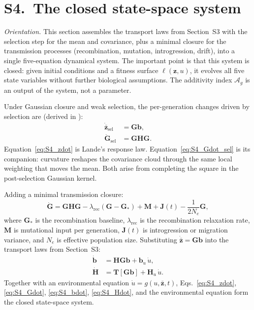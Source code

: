 \documentclass[11pt]{article}
\newcommand{\vect}[1]{\boldsymbol{#1}}
\newcommand{\mat}[1]{\mathbf{#1}}
\newcommand{\Ag}{\mathcal{A}_{g}}
\begin{document}
\section*{S4.~The closed state-space system}
\label{sec:statespace}

\noindent\textit{Orientation.}
This section assembles the transport laws from Section~S3
with the selection step for the mean and covariance, plus a
minimal closure for the transmission processes (recombination,
mutation, introgression, drift), into a single five-equation
dynamical system.
The important point is that this system is closed: given initial
conditions and a fitness surface $\ell(\vect{z},u)$, it evolves
all five state variables without further biological assumptions.
The additivity index $\Ag$ is an output of the system, not a
parameter.

Under Gaussian closure and weak selection, the per-generation
changes driven by selection are (derived in \cite{OrtizBarrientosCooper2026}):
\begin{align}
\dot{\bar{\vect{z}}}_{\mathrm{sel}} &= \mat{G}\vect{b},
\label{eq:S4_zdot} \\[4pt]
\dot{\mat{G}}_{\mathrm{sel}} &= \mat{G}\mat{H}\mat{G}.
\label{eq:S4_Gdot_sel}
\end{align}
Equation~\eqref{eq:S4_zdot} is Lande's response law.
Equation~\eqref{eq:S4_Gdot_sel} is its companion: curvature
reshapes the covariance cloud through the same local weighting
that moves the mean.
Both arise from completing the square in the post-selection
Gaussian kernel.

Adding a minimal transmission closure:
\begin{equation}
\dot{\mat{G}}
= \mat{G}\mat{H}\mat{G}
  - \lambda_{\mathrm{rec}}(\mat{G} - \mat{G}_*)
  + \mat{M}
  + \mat{J}(t)
  - \frac{1}{2N_e}\mat{G},
\label{eq:S4_Gdot}
\end{equation}
where $\mat{G}_*$ is the recombination baseline, $\lambda_{\mathrm{rec}}$
is the recombination relaxation rate, $\mat{M}$ is mutational
input per generation, $\mat{J}(t)$ is introgression or migration
variance, and $N_e$ is effective population size.
Substituting $\dot{\bar{\vect{z}}} = \mat{G}\vect{b}$ into
the transport laws from Section~S3:
\begin{align}
\dot{\vect{b}} &= \mat{H}\mat{G}\vect{b} + \vect{b}_u\,\dot{u},
\label{eq:S4_bdot} \\
\dot{\mat{H}} &= \mat{T}[\mat{G}\vect{b}] + \mat{H}_u\,\dot{u}.
\label{eq:S4_Hdot}
\end{align}
Together with an environmental equation
$\dot{u} = g(u,\bar{\vect{z}},t)$,
Eqs.~\eqref{eq:S4_zdot}, \eqref{eq:S4_Gdot},
\eqref{eq:S4_bdot}, \eqref{eq:S4_Hdot}, and the environmental
equation form the closed state-space system.
\end{document}
